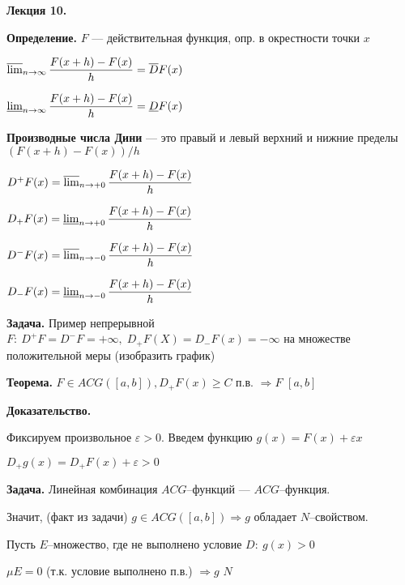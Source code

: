 

\begin{center} \textbf{Лекция 10.} \end{center}

\textbf{Определение.} \quad $F$ --- действительная функция, опр. в
окрестности точки $x$

$\varlimsup_{n \rightarrow \infty} \dfrac{F(x+h) - F(x)}{h} =
\overline{D} F(x)$

$\varliminf_{n \rightarrow \infty} \dfrac{F(x+h) - F(x)}{h} =
\underline{D} F(x)$


%
%
%
%
%
%
%
%
%
%
%


\textbf{Производные числа Дини} \quad --- это правый и левый
верхний и нижние пределы $(F(x + h) - F(x))/h$


$D^+ F(x) = \varlimsup_{n \rightarrow +0} \dfrac{F(x+h) - F(x)}{h}
$

$D_+ F(x) = \varliminf_{n \rightarrow +0} \dfrac{F(x+h) - F(x)}{h}
$

$D^- F(x) = \varlimsup_{n \rightarrow -0} \dfrac{F(x+h) - F(x)}{h}
$

$D_- F(x) = \varliminf_{n \rightarrow -0} \dfrac{F(x+h) - F(x)}{h}
$

\textbf{Задача.} \quad Пример непрерывной $F: \: D^+ F = D^- F = +
\infty, \; D_+ F(X) = D_-F(x) = -\infty$ на множестве
положительной меры (изобразить график)

\textbf{Теорема.} \quad $F \in ACG([a,b]), D_+ F(x) \geqslant C$
п.в.  $\Rightarrow F$ $[a,b]$

\textbf{Доказательство.} \quad

Фиксируем произвольное $\varepsilon > 0$. Введем функцию $g(x) =
F(x) + \varepsilon x$

$D_+ g(x) = D_+ F(x) + \varepsilon > 0$

\textbf{Задача.} \quad Линейная комбинация $ACG$--функций ---
$ACG$--функция.

Значит, (факт из задачи) $g \in ACG([a,b]) \Rightarrow g$ обладает
$N$--свойством.

Пусть $E$--множество, где не выполнено условие $D: \: g(x) > 0$

$\mu E = 0$ (т.к. условие выполнено п.в.) $\Rightarrow g$ $N$

